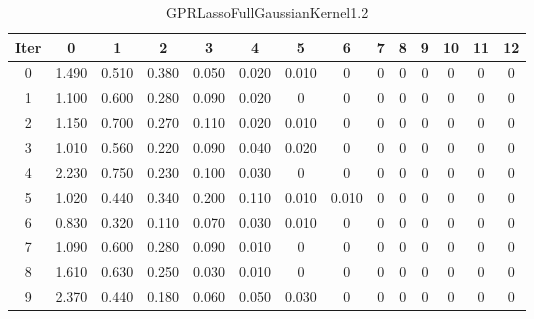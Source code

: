 \begin{table}
	\begin{center}
		\begin{tabular}{|c|c|c|c|c|c|c|c|c|c|c|c|c|c|}
			\hline
			Iter & 0 & 1 & 2 & 3 & 4 & 5 & 6 & 7 & 8 & 9 & 10 & 11 & 12 \\
			\hline
			0 & 1.490 & 0.510 & 0.380 & 0.050 & 0.020 & 0.010 & 0 & 0 & 0 & 0 & 0 & 0 & 0 \\
			\hline
			1 & 1.100 & 0.600 & 0.280 & 0.090 & 0.020 & 0 & 0 & 0 & 0 & 0 & 0 & 0 & 0 \\
			\hline
			2 & 1.150 & 0.700 & 0.270 & 0.110 & 0.020 & 0.010 & 0 & 0 & 0 & 0 & 0 & 0 & 0 \\
			\hline
			3 & 1.010 & 0.560 & 0.220 & 0.090 & 0.040 & 0.020 & 0 & 0 & 0 & 0 & 0 & 0 & 0 \\
			\hline
			4 & 2.230 & 0.750 & 0.230 & 0.100 & 0.030 & 0 & 0 & 0 & 0 & 0 & 0 & 0 & 0 \\
			\hline
			5 & 1.020 & 0.440 & 0.340 & 0.200 & 0.110 & 0.010 & 0.010 & 0 & 0 & 0 & 0 & 0 & 0 \\
			\hline
			6 & 0.830 & 0.320 & 0.110 & 0.070 & 0.030 & 0.010 & 0 & 0 & 0 & 0 & 0 & 0 & 0 \\
			\hline
			7 & 1.090 & 0.600 & 0.280 & 0.090 & 0.010 & 0 & 0 & 0 & 0 & 0 & 0 & 0 & 0 \\
			\hline
			8 & 1.610 & 0.630 & 0.250 & 0.030 & 0.010 & 0 & 0 & 0 & 0 & 0 & 0 & 0 & 0 \\
			\hline
			9 & 2.370 & 0.440 & 0.180 & 0.060 & 0.050 & 0.030 & 0 & 0 & 0 & 0 & 0 & 0 & 0 \\
			\hline
		\end{tabular}
	\end{center}
	\caption{GPRLassoFullGaussianKernel1.2}
\end{table}